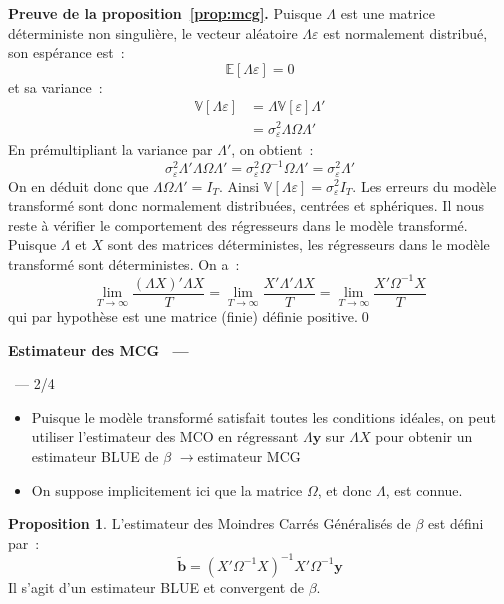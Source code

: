 \documentclass[10pt,a4paper]{article}
\makeatletter
\theoremstyle{definition}
\newtheorem{prop}{Proposition}
\renewcommand{\newline}{\unskip\par\vspace{1.5pt}}
\newenvironment{frame}[1][]{\par}{\par}
\newcommand{\frameheadrule}{%
  \par\nobreak\vspace{1pt}{\color{ctitle}\hrule height 0.6pt}\nobreak\vspace{4pt}}
\newcommand{\frametitle}[1]{%
  \par\addvspace{8pt plus 2pt}\needspace{6\baselineskip}%
  \noindent\begingroup\color{ctitle}\sffamily\bfseries\large #1\endgroup
  \@ifnextchar\framesubtitle{}{\frameheadrule}}
\newcommand{\framesubtitle}[1]{%
  \begingroup\color{ctitle}\sffamily\normalsize\ --- #1\endgroup\frameheadrule}
\makeatother
\begin{document}
\begin{notes}

  \textbf{Preuve de la proposition~\ref{prop:mcg}.} Puisque $\Lambda$ est une matrice déterministe non singulière, le vecteur aléatoire $\Lambda\varepsilon$ est normalement distribué, son espérance est~:
  \[
    \mathbb E [\Lambda\varepsilon] = 0
  \]
  et sa variance~:
  \[
    \begin{split}
      \mathbb V[\Lambda\varepsilon] &= \Lambda \mathbb V[\varepsilon] \Lambda'\\
      &= \sigma_{\varepsilon}^2 \Lambda \Omega \Lambda'
    \end{split}
  \]
  En prémultipliant la variance par $\Lambda'$, on obtient~:
  \[
    \sigma_{\varepsilon}^2\Lambda'\Lambda \Omega\Lambda' = \sigma_{\varepsilon}^2\Omega^{-1}\Omega \Lambda' = \sigma_{\varepsilon}^2\Lambda'
  \]
  On en déduit donc que $\Lambda \Omega \Lambda' = I_T$. Ainsi $\mathbb V [\Lambda\varepsilon] = \sigma_{\varepsilon}^2I_T$. Les erreurs du modèle transformé sont donc normalement distribuées, centrées et sphériques. Il nous reste à vérifier le comportement des régresseurs dans le modèle transformé. Puisque $\Lambda$ et $X$ sont des matrices déterministes, les régresseurs dans le modèle transformé sont déterministes. On a~:
  \[
    \lim_{T\rightarrow\infty}\frac{(\Lambda X)'\Lambda X}{T} = \lim_{T\rightarrow\infty}\frac{X'\Lambda'\Lambda X}{T} = \lim_{T\rightarrow\infty}\frac{X'\Omega^{-1} X}{T}
  \]
  qui par hypothèse est une matrice (finie) définie positive.\qed
\end{notes}


\begin{frame}
  \frametitle{Estimateur des MCG}
  \framesubtitle{2/4}

  \begin{itemize}

  \item Puisque le modèle transformé satisfait toutes les conditions idéales, on peut utiliser l'estimateur des MCO en régressant $\Lambda \mathbf y$ sur $\Lambda X$ pour obtenir un estimateur BLUE de $\beta$ $\rightarrow$estimateur MCG\newline

  \item On suppose implicitement ici que la matrice $\Omega$, et donc $\Lambda$, est connue.\newline

  \end{itemize}


  \begin{prop}\label{prop:mcg:def}
    L'estimateur des Moindres Carrés Généralisés de $\beta$ est défini par~:
    \[
      \tilde{\mathbf b} = (X'\Omega^{-1}X)^{-1}X'\Omega^{-1}\mathbf y
    \]
    Il s'agit d'un estimateur BLUE et convergent de $\beta$.
  \end{prop}


\end{frame}
\end{document}
